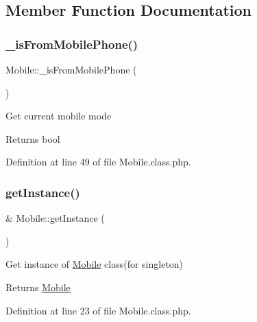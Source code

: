 \subsection{Member Function Documentation}
\hypertarget{classMobile_a5f539dee62a4a3e83db1df0f2d9573e4}{}\label{classMobile_a5f539dee62a4a3e83db1df0f2d9573e4} 
\subsubsection{\texorpdfstring{\+\_\+is\+From\+Mobile\+Phone()}{\_isFromMobilePhone()}}
{\footnotesize\ttfamily Mobile\+::\+\_\+is\+From\+Mobile\+Phone (\begin{DoxyParamCaption}{ }\end{DoxyParamCaption})}

Get current mobile mode

\begin{DoxyReturn}{Returns}
bool 
\end{DoxyReturn}


Definition at line 49 of file Mobile.\+class.\+php.

\hypertarget{classMobile_a303f0bf07eb32a56769009c12c70d954}{}\label{classMobile_a303f0bf07eb32a56769009c12c70d954} 
\subsubsection{\texorpdfstring{get\+Instance()}{getInstance()}}
{\footnotesize\ttfamily \& Mobile\+::get\+Instance (\begin{DoxyParamCaption}{ }\end{DoxyParamCaption})}

Get instance of \hyperlink{classMobile}{Mobile} class(for singleton)

\begin{DoxyReturn}{Returns}
\hyperlink{classMobile}{Mobile} 
\end{DoxyReturn}


Definition at line 23 of file Mobile.\+class.\+php.

\hypertarget{classMobile_a9978671e8463a94130a6733f2d0fa0a4}{}\label{classMobile_a9978671e8463a94130a6733f2d0fa0a4} 

